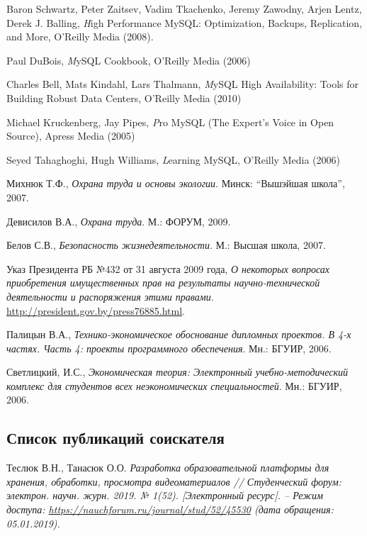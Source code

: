 \begin{thebibliography}{}
\bibitem{}
  Baron Schwartz, Peter Zaitsev, Vadim Tkachenko, Jeremy Zawodny, Arjen Lentz, Derek J. Balling,
  \emph High Performance MySQL: Optimization, Backups, Replication, and More,
  O'Reilly Media (2008).


\bibitem{}
  Paul DuBois,
  \emph MySQL Cookbook,
  O'Reilly Media (2006)

\bibitem{}
  Charles Bell, Mats Kindahl, Lars Thalmann,
  \emph MySQL High Availability: Tools for Building Robust Data Centers,
  O'Reilly Media (2010)

\bibitem{}
  Michael Kruckenberg, Jay Pipes,
  \emph Pro MySQL (The Expert's Voice in Open Source),
  Apress Media (2005)

\bibitem{}
  Seyed Tahaghoghi, Hugh Williams,
  \emph Learning MySQL,
  O'Reilly Media (2006)

  Михнюк Т.Ф.,
  \emph{Охрана труда и основы экологии}.
  Минск: ``Вышэйшая школа'',
  2007.

  Девисилов В.А.,
  \emph{Охрана труда}.
  М.: ФОРУМ,
  2009.

  Белов С.В.,
  \emph{Безопасность жизнедеятельности}.
  М.: Высшая школа,
  2007.

  Указ Президента РБ №432 от 31 августа 2009 года,
  \emph{О некоторых вопросах приобретения имущественных прав на результаты научно-технической деятельности и распоряжения этими правами}.
  \href{http://president.gov.by/press76885.html}{http://president.gov.by/press76885.html}.

  Палицын В.А.,
  \emph{Технико-экономическое обоснование дипломных проектов. В 4-х частях. Часть 4: проекты программного обеспечения}.
  Мн.: БГУИР,
  2006.

  Светлицкий, И.С.,
  \emph{Экономическая теория: Электронный учебно-методический комплекс для студентов всех неэкономических специальностей}.
  Мн.: БГУИР,
  2006.

\end{thebibliography}

\subsection*{Список публикаций соискателя}

\begin{thebibliography}{}

\bibitem{}
  Теслюк В.Н., Танасюк О.О.
  \emph{Разработка образовательной платформы для хранения, обработки, просмотра видеоматериалов
  // Студенческий форум: электрон. научн. журн. 2019. № 1(52).
  [Электронный ресурс]. – Режим доступа:
  \href{https://nauchforum.ru/journal/stud/52/45530}{https://nauchforum.ru/journal/stud/52/45530}
  (дата обращения: 05.01.2019).}

\end{thebibliography}{}

\endgroup
